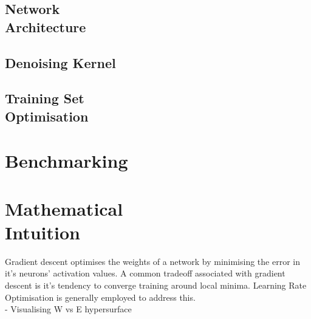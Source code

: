 \documentclass[12pt]{article}
\begin{document}
\begin{multicols}{2}
		\subsection{Network \\Architecture}

		\subsection{Denoising Kernel}

		\subsection{Training Set \\Optimisation}
		
		\section{Benchmarking}
		
		\section{Mathematical \\Intuition}
		Gradient descent optimises the weights of a network by minimising the error in it's neurons' activation values. A common tradeoff associated with gradient descent is it's tendency to converge training around local minima. Learning Rate Optimisation is generally employed to address this.
		\\
		- Visualising W vs E hypersurface
		
	\end{multicols}

	\begin{multicols}{2}
		
	\end{multicols}
	
	
	
	
	
\end{document}
